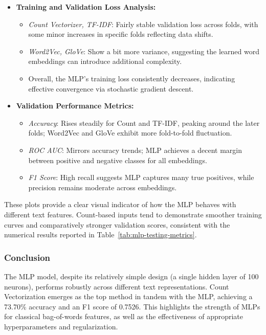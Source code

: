 \begin{itemize}
    \item \textbf{Training and Validation Loss Analysis:}
    \begin{itemize}
        \item \textit{Count Vectorizer, TF-IDF}: Fairly stable validation loss across folds, with some minor increases in specific folds reflecting data shifts.
        \item \textit{Word2Vec, GloVe}: Show a bit more variance, suggesting the learned word embeddings can introduce additional complexity.
        \item Overall, the MLP’s training loss consistently decreases, indicating effective convergence via stochastic gradient descent.
    \end{itemize}
    
    \item \textbf{Validation Performance Metrics:}
    \begin{itemize}
        \item \textit{Accuracy}: Rises steadily for Count and TF-IDF, peaking around the later folds; Word2Vec and GloVe exhibit more fold-to-fold fluctuation.
        \item \textit{ROC AUC}: Mirrors accuracy trends; MLP achieves a decent margin between positive and negative classes for all embeddings.
        \item \textit{F1 Score}: High recall suggests MLP captures many true positives, while precision remains moderate across embeddings.
    \end{itemize}
\end{itemize}

These plots provide a clear visual indicator of how the MLP behaves with different text features. 
Count-based inputs tend to demonstrate smoother training curves and comparatively stronger 
validation scores, consistent with the numerical results reported in Table~\ref{tab:mlp-testing-metrics}.

\subsubsection{Conclusion}

The MLP model, despite its relatively simple design (a single hidden layer of 100 neurons), performs robustly across different text representations. Count Vectorization emerges as the top method in tandem with the MLP, achieving a 73.70\% accuracy and an F1 score of 0.7526. This highlights the strength of MLPs for classical bag-of-words features, as well as the effectiveness of appropriate hyperparameters and regularization.

